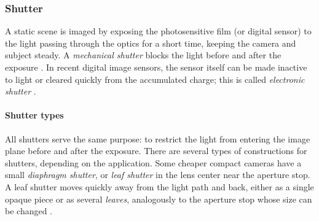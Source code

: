 


\subsubsection{Shutter} %


A static scene is imaged by exposing the photosensitive film (or digital sensor) to the light passing through the optics for a short time, keeping the camera and subject steady.
A \emph{mechanical shutter} blocks the light before and after the exposure \cite{greenleaf1950photographic}.
In recent digital image sensors, the sensor itself can be made inactive to light or cleared quickly from the accumulated charge; this is called \emph{electronic shutter} \cite{caspeelectronic,kodakshutter}.





\paragraph{Shutter types}
All shutters serve the same purpose: to restrict the light from entering the image plane before and after the exposure.
There are several types of constructions for shutters, depending on the application.
Some cheaper compact cameras have a small \emph{diaphragm shutter}, or \emph{leaf shutter} in the lens center near the aperture stop.
A leaf shutter moves quickly away from the light path and back, either as a single opaque piece or as several \emph{leaves}, analogously to the aperture stop whose size can be changed \cite{greenleaf1950photographic}.


